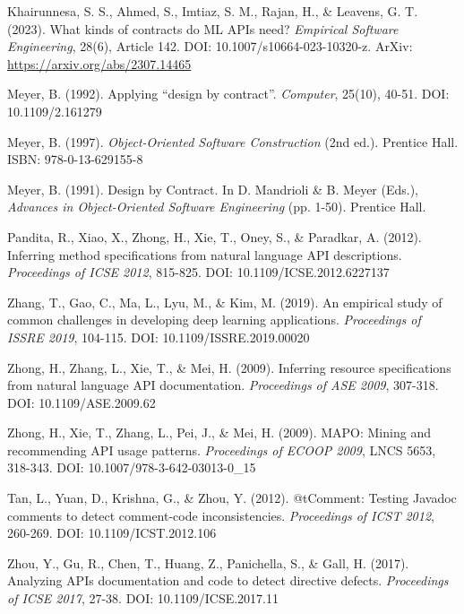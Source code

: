 \documentclass[11pt]{article}
\begin{document}
\begin{thebibliography}{99}

Khairunnesa, S. S., Ahmed, S., Imtiaz, S. M., Rajan, H., \& Leavens, G. T. (2023). What kinds of contracts do ML APIs need? \textit{Empirical Software Engineering}, 28(6), Article 142. DOI: 10.1007/s10664-023-10320-z. ArXiv: \url{https://arxiv.org/abs/2307.14465}

Meyer, B. (1992). Applying ``design by contract''. \textit{Computer}, 25(10), 40-51. DOI: 10.1109/2.161279

Meyer, B. (1997). \textit{Object-Oriented Software Construction} (2nd ed.). Prentice Hall. ISBN: 978-0-13-629155-8

Meyer, B. (1991). Design by Contract. In D. Mandrioli \& B. Meyer (Eds.), \textit{Advances in Object-Oriented Software Engineering} (pp. 1-50). Prentice Hall.

Pandita, R., Xiao, X., Zhong, H., Xie, T., Oney, S., \& Paradkar, A. (2012). Inferring method specifications from natural language API descriptions. \textit{Proceedings of ICSE 2012}, 815-825. DOI: 10.1109/ICSE.2012.6227137

Zhang, T., Gao, C., Ma, L., Lyu, M., \& Kim, M. (2019). An empirical study of common challenges in developing deep learning applications. \textit{Proceedings of ISSRE 2019}, 104-115. DOI: 10.1109/ISSRE.2019.00020

Zhong, H., Zhang, L., Xie, T., \& Mei, H. (2009). Inferring resource specifications from natural language API documentation. \textit{Proceedings of ASE 2009}, 307-318. DOI: 10.1109/ASE.2009.62

Zhong, H., Xie, T., Zhang, L., Pei, J., \& Mei, H. (2009). MAPO: Mining and recommending API usage patterns. \textit{Proceedings of ECOOP 2009}, LNCS 5653, 318-343. DOI: 10.1007/978-3-642-03013-0\_15

Tan, L., Yuan, D., Krishna, G., \& Zhou, Y. (2012). @tComment: Testing Javadoc comments to detect comment-code inconsistencies. \textit{Proceedings of ICST 2012}, 260-269. DOI: 10.1109/ICST.2012.106

Zhou, Y., Gu, R., Chen, T., Huang, Z., Panichella, S., \& Gall, H. (2017). Analyzing APIs documentation and code to detect directive defects. \textit{Proceedings of ICSE 2017}, 27-38. DOI: 10.1109/ICSE.2017.11


\end{thebibliography}
\end{document}
